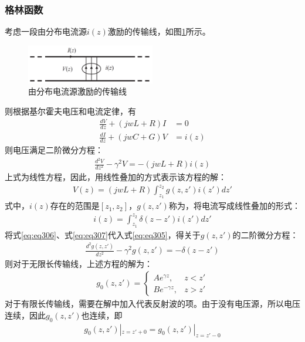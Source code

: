 \documentclass{article}
\numberwithin{equation}{section}
\begin{document}
\subsubsection{格林函数}
考虑一段由分布电流源$i(z)$激励的传输线，如图\ref{fig:fig39}所示。
\begin{figure}[ht]
    \centering
    \includegraphics[width=0.5\textwidth]{由分布电流源激励的传输线.PNG}
    \caption{由分布电流源激励的传输线}
    \label{fig:fig39}
\end{figure}
则根据基尔霍夫电压和电流定律，有
\begin{align}
    \label{eq:eq303}
    \frac{dV}{dz}+(jwL+R)I&=0 \\
    \label{eq:eq304}
    \frac{dI}{dz}+(jwC+G)V&=i(z)
\end{align}
则电压满足二阶微分方程：
\begin{align}
    \label{eq:eq305}
    \frac{d^2V}{dz^2}-\gamma^2V=-(jwL+R)i(z)
\end{align}
上式为线性方程，因此，用线性叠加的方式表示该方程的解：
\begin{align}
    \label{eq:eq306}
    V(z)=(jwL+R)\int^{z_2}_{z_1}g(z,z')i(z')dz'
\end{align}
式中，$i(z)$存在的范围是$[z_1,z_2]$，$g(z,z')$称为\textbf{\color{blue}{格林函数}}，将电流写成线性叠加的形式：
\begin{align}
    \label{eq:eq307}
    i(z)=\int^{z_2}_{z_1}\delta(z-z')i(z')dz'
\end{align}
将式\ref{eq:eq306}、式\ref{eq:eq307}代入式\ref{eq:eq305}，得关于$g(z,z')$的二阶微分方程：
\begin{align}
    \label{eq:eq308}
    \frac{d^2g(z,z')}{dz^2}-\gamma^2g(z,z')=-\delta(z-z')
\end{align}
则对于无限长传输线，上述方程的解为：
\begin{align}
    \label{eq:eq309}
    g_0(z,z')=
    \left\{
        \begin{array}{lr}
            Ae^{\gamma z}, &z<z' \\
            Be^{-\gamma z}, &z>z'
        \end{array}
    \right.
\end{align}
对于有限长传输线，需要在解中加入代表反射波的项。由于没有电压源，所以电压连续，因此$g_0(z,z')$也连续，即
\begin{align}
    \label{eq:eq310}
    g_0(z,z')|_{z=z'+0}=g_0(z,z')|_{z=z'-0}
\end{align}
\end{document}
